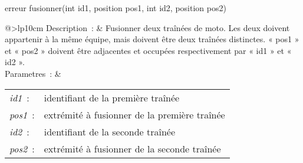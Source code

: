 \begin{minipage}{\linewidth}

\begin{lst-c++}
erreur fusionner(int id1, position pos1, int id2, position pos2)
\end{lst-c++}

\noindent
\begin{tabular}[t]{@{\extracolsep{0pt}}>{\bfseries}lp{10cm}}
Description~: & Fusionner deux traînées de moto. Les deux doivent appartenir à la même équipe, mais doivent être deux traînées distinctes. « pos1 » et « pos2 » doivent être adjacentes et occupées respectivement par « id1 » et « id2 ». \\


Parametres~: &
\begin{tabular}[t]{@{\extracolsep{0pt}}ll}
    
    
      
        \textsl{id1}~: & identifiant de la première traînée \\
      
    
      
        \textsl{pos1}~: & extrémité à fusionner de la première traînée \\
      
    
      
        \textsl{id2}~: & identifiant de la seconde traînée \\
      
    
      
        \textsl{pos2}~: & extrémité à fusionner de la seconde traînée \\
      
    
  \end{tabular} \\






\end{tabular} \\[0.3cm]
\end{minipage}




